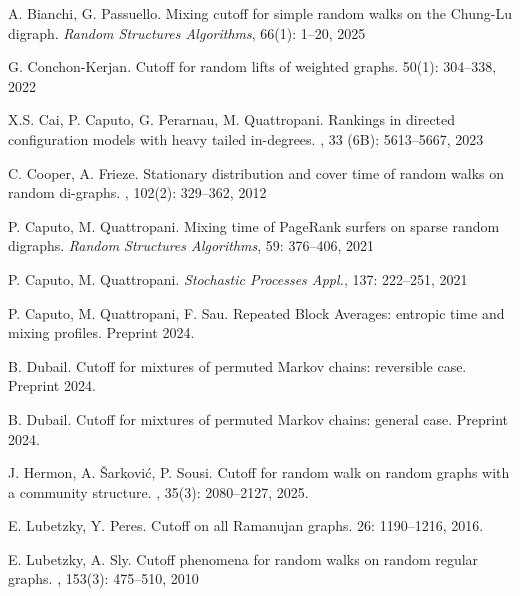 \documentclass[11pt,oneside]{amsart}
\numberwithin{equation}{section}  %
\theoremstyle{plain}
\begin{document}
\begin{thebibliography}{}
    
	A. Bianchi, G. Passuello.
	\newblock  Mixing cutoff for simple random walks on the Chung-Lu digraph. 
    {\em Random Structures Algorithms}, 66(1): 1--20, 2025 

	G. Conchon-Kerjan.
	\newblock Cutoff for random lifts of weighted graphs.
	  50(1): 304--338, 2022
	
	X.S. Cai, P. Caputo, G. Perarnau, M. Quattropani.
	 \newblock  Rankings in directed configuration models
	 with heavy tailed in-degrees. 
	 , 33 (6B): 5613--5667, 2023

    C. Cooper, A. Frieze.
    	\newblock Stationary distribution and cover time of random walks on random di-graphs.
	, 102(2): 329--362, 2012


	
P. Caputo, M. Quattropani.
	Mixing time of PageRank surfers on sparse random digraphs. 
	{\em Random Structures Algorithms},	{59}: 376--406, 2021

P. Caputo, M. Quattropani.
	{\em Stochastic Processes Appl.}, 137: 222--251, 2021


P. Caputo, M. Quattropani, F. Sau.
\newblock Repeated Block Averages: entropic time and mixing profiles. Preprint 2024. 



	B. Dubail.
	\newblock Cutoff for mixtures of permuted Markov chains: reversible case.
	\newblock Preprint 2024.
	
	B. Dubail.
	\newblock Cutoff for mixtures of permuted Markov chains: general case.
	\newblock Preprint 2024.
	    
    
    J. Hermon, A. Šarković, P. Sousi.
\newblock Cutoff for random walk on random graphs with a community structure.
	, 35(3): 2080--2127, 2025.

	E. Lubetzky, Y. Peres.
	\newblock Cutoff on all Ramanujan graphs. 
	 26: 1190--1216, 2016.


	E. Lubetzky, A. Sly.
	\newblock Cutoff phenomena for random walks on random regular graphs.
	, 153(3): 475--510, 2010
	

\end{thebibliography}
\end{document}
